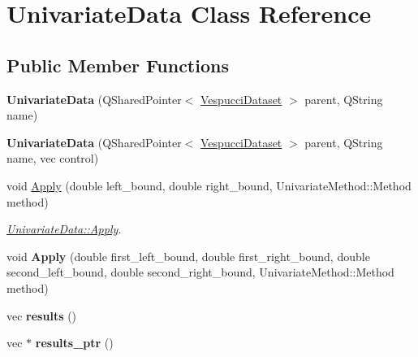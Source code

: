 \hypertarget{class_univariate_data}{\section{Univariate\+Data Class Reference}
\label{class_univariate_data}
}
\subsection*{Public Member Functions}
\begin{DoxyCompactItemize}
\item 
\hypertarget{class_univariate_data_a80e1b6d77a6a6b9d0f1cb7648dec8a5c}{{\bfseries Univariate\+Data} (Q\+Shared\+Pointer$<$ \hyperlink{class_vespucci_dataset}{Vespucci\+Dataset} $>$ parent, Q\+String name)}\label{class_univariate_data_a80e1b6d77a6a6b9d0f1cb7648dec8a5c}

\item 
\hypertarget{class_univariate_data_a290f47c96e672fdbd4ef70b1c2e87917}{{\bfseries Univariate\+Data} (Q\+Shared\+Pointer$<$ \hyperlink{class_vespucci_dataset}{Vespucci\+Dataset} $>$ parent, Q\+String name, vec control)}\label{class_univariate_data_a290f47c96e672fdbd4ef70b1c2e87917}

\item 
void \hyperlink{class_univariate_data_a3a476f351459feae0b8fc21ed957cd27}{Apply} (double left\+\_\+bound, double right\+\_\+bound, Univariate\+Method\+::\+Method method)
\begin{DoxyCompactList}\small\item\em \hyperlink{class_univariate_data_a3a476f351459feae0b8fc21ed957cd27}{Univariate\+Data\+::\+Apply}. \end{DoxyCompactList}\item 
\hypertarget{class_univariate_data_a6fcd8a5aded5968c98df6eaa81f71221}{void {\bfseries Apply} (double first\+\_\+left\+\_\+bound, double first\+\_\+right\+\_\+bound, double second\+\_\+left\+\_\+bound, double second\+\_\+right\+\_\+bound, Univariate\+Method\+::\+Method method)}\label{class_univariate_data_a6fcd8a5aded5968c98df6eaa81f71221}

\item 
\hypertarget{class_univariate_data_af116339377dbafbab2a9473e6d098354}{vec {\bfseries results} ()}\label{class_univariate_data_af116339377dbafbab2a9473e6d098354}

\item 
\hypertarget{class_univariate_data_a85a8764c5bc30a1c96a294f147bce05f}{vec $\ast$ {\bfseries results\+\_\+ptr} ()}\label{class_univariate_data_a85a8764c5bc30a1c96a294f147bce05f}


\end{DoxyCompactItemize}

